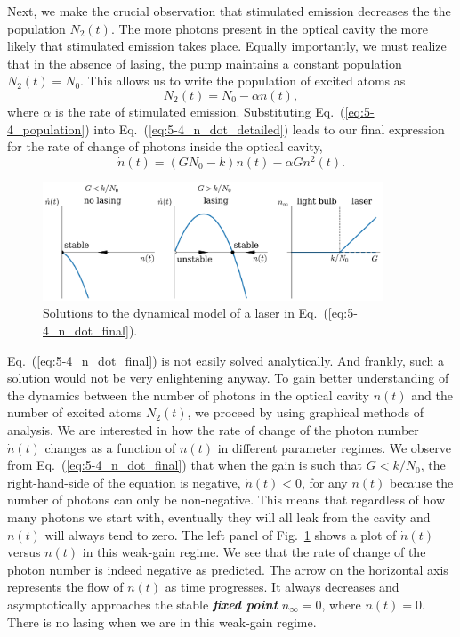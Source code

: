 Next, we make the crucial observation that stimulated emission decreases the the population $N_2(t)$.
The more photons present in the optical cavity the more likely that stimulated emission takes place.
Equally importantly, we must realize that in the absence of lasing, the pump maintains a constant population $N_2(t) = N_0$.
This allows us to write the population of excited atoms as
\begin{equation}
    N_2(t) = N_0 - \alpha n(t),
    \label{eq:5-4_population}
\end{equation}
where $\alpha$ is the rate of stimulated emission.
Substituting Eq.~(\ref{eq:5-4_population}) into Eq.~(\ref{eq:5-4_n_dot_detailed}) leads to our final expression for the rate of change of photons inside the optical cavity,
\begin{equation}
    \dot{n}(t) = (G N_0 - k) n(t) - \alpha G n^2(t).
    \label{eq:5-4_n_dot_final}
\end{equation}

\begin{figure}
    \centering
    \includegraphics[width=0.9\textwidth]{lesson5/5-4_lasing.pdf}
    \caption[Dynamical model of a laser]{Solutions to the dynamical model of a laser in Eq.~(\ref{eq:5-4_n_dot_final}).}
    \label{fig:5-4_lasing}
\end{figure}

Eq.~(\ref{eq:5-4_n_dot_final}) is not easily solved analytically.
And frankly, such a solution would not be very enlightening anyway.
To gain better understanding of the dynamics between the number of photons in the optical cavity $n(t)$ and the number of excited atoms $N_2(t)$, we proceed by using graphical methods of analysis.
We are interested in how the rate of change of the photon number $\dot{n}(t)$ changes as a function of $n(t)$ in different parameter regimes.
We observe from Eq.~(\ref{eq:5-4_n_dot_final}) that when the gain is such that $G < k / N_0$, the right-hand-side of the equation is negative, $\dot{n}(t) < 0$, for any $n(t)$ because the number of photons can only be non-negative.
This means that regardless of how many photons we start with, eventually they will all leak from the cavity and $n(t)$ will always tend to zero.
The left panel of Fig.~\ref{fig:5-4_lasing} shows a plot of $\dot{n}(t)$ versus $n(t)$ in this weak-gain regime.
We see that the rate of change of the photon number is indeed negative as predicted.
The arrow on the horizontal axis represents the flow of $n(t)$ as time progresses.
It always decreases and asymptotically approaches the stable \textit{\textbf{fixed point}} $n_{\infty} = 0$, where $\dot{n}(t) = 0$.
There is no lasing when we are in this weak-gain regime.

